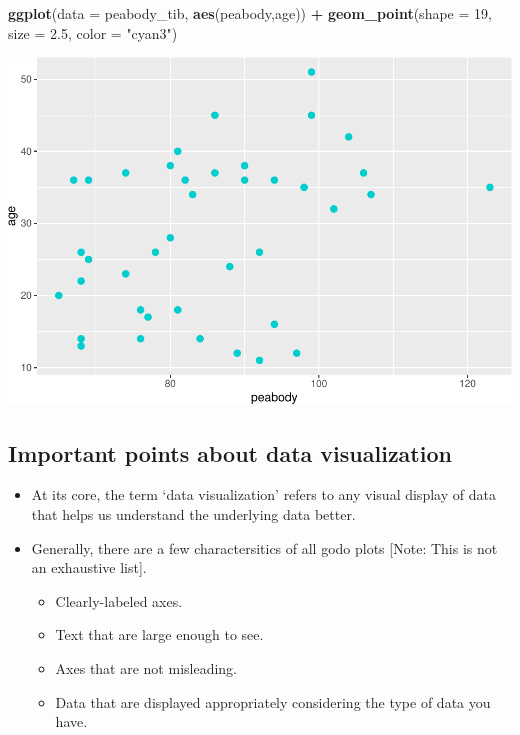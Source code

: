 \documentclass[
]{book}
\newenvironment{Shaded}{\begin{snugshade}}{\end{snugshade}}
\newcommand{\AttributeTok}[1]{\textcolor[rgb]{0.13,0.29,0.53}{#1}}
\newcommand{\DecValTok}[1]{\textcolor[rgb]{0.00,0.00,0.81}{#1}}
\newcommand{\FloatTok}[1]{\textcolor[rgb]{0.00,0.00,0.81}{#1}}
\newcommand{\FunctionTok}[1]{\textcolor[rgb]{0.13,0.29,0.53}{\textbf{#1}}}
\newcommand{\NormalTok}[1]{#1}
\newcommand{\SpecialCharTok}[1]{\textcolor[rgb]{0.81,0.36,0.00}{\textbf{#1}}}
\newcommand{\StringTok}[1]{\textcolor[rgb]{0.31,0.60,0.02}{#1}}
\providecommand{\tightlist}{%
  \setlength{\itemsep}{0pt}\setlength{\parskip}{0pt}}
\begin{document}
\begin{Shaded}
\begin{Highlighting}[]
\FunctionTok{ggplot}\NormalTok{(}\AttributeTok{data =}\NormalTok{ peabody\_tib, }\FunctionTok{aes}\NormalTok{(peabody,age)) }\SpecialCharTok{+}
  \FunctionTok{geom\_point}\NormalTok{(}\AttributeTok{shape =} \DecValTok{19}\NormalTok{, }\AttributeTok{size =} \FloatTok{2.5}\NormalTok{, }\AttributeTok{color =} \StringTok{"cyan3"}\NormalTok{)}
\end{Highlighting}
\end{Shaded}

\includegraphics{PSY202A-Modeling-I.Heo_files/figure-latex/unnamed-chunk-82-1.pdf}

\subsection{Important points about data visualization}\label{important-points-about-data-visualization}

\begin{itemize}
\item
  At its core, the term `data visualization' refers to any visual display of data that helps us understand the underlying data better.
\item
  Generally, there are a few charactersitics of all godo plots {[}Note: This is not an exhaustive list{]}.

  \begin{itemize}
  \tightlist
  \item
    Clearly-labeled axes.
  \item
    Text that are large enough to see.
  \item
    Axes that are not misleading.
  \item
    Data that are displayed appropriately considering the type of data you have.
  \end{itemize}
\end{itemize}
\end{document}
